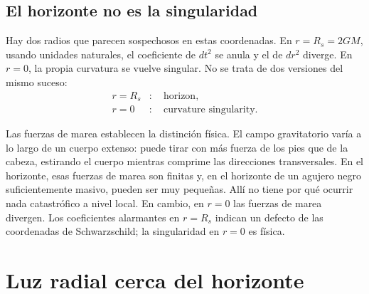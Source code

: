 
\subsection{El horizonte no es la singularidad}

Hay dos radios que parecen sospechosos en estas coordenadas. En \(r=R_s=2GM\), usando unidades naturales, el coeficiente de \(dt^2\) se anula y el de \(dr^2\) diverge. En \(r=0\), la propia curvatura se vuelve singular. No se trata de dos versiones del mismo suceso:
\begin{equation}
\begin{aligned}
r=R_s &:\quad \text{horizon},\\
r=0 &:\quad \text{curvature singularity}.
\end{aligned}
\end{equation}

Las fuerzas de marea establecen la distinción física. El campo gravitatorio varía a lo largo de un cuerpo extenso: puede tirar con más fuerza de los pies que de la cabeza, estirando el cuerpo mientras comprime las direcciones transversales. En el horizonte, esas fuerzas de marea son finitas y, en el horizonte de un agujero negro suficientemente masivo, pueden ser muy pequeñas. Allí no tiene por qué ocurrir nada catastrófico a nivel local. En cambio, en \(r=0\) las fuerzas de marea divergen. Los coeficientes alarmantes en \(r=R_s\) indican un defecto de las coordenadas de Schwarzschild; la singularidad en \(r=0\) es física.


\section{Luz radial cerca del horizonte}

